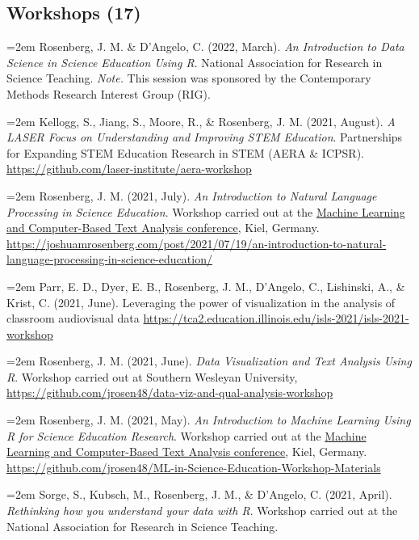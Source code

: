 \documentclass[
  14,
]{article}
\begin{document}
\hypertarget{workshops-17}{%
\subsection{Workshops (17)}\label{workshops-17}}

\hangindent=2em Rosenberg, J. M. \& D'Angelo, C. (2022, March). \emph{An
Introduction to Data Science in Science Education Using R}. National
Association for Research in Science Teaching. \emph{Note.} This session
was sponsored by the Contemporary Methods Research Interest Group (RIG).

\hangindent=2em Kellogg, S., Jiang, S., Moore, R., \& Rosenberg, J. M.
(2021, August). \emph{A LASER Focus on Understanding and Improving STEM
Education}. Partnerships for Expanding STEM Education Research in STEM
(AERA \& ICPSR). \url{https://github.com/laser-institute/aera-workshop}

\hangindent=2em Rosenberg, J. M. (2021, July). \emph{An Introduction to
Natural Language Processing in Science Education}. Workshop carried out
at the
\href{https://www.ipn.uni-kiel.de/en/the-ipn/news/gdcp-focus-conference-machine-learning-and-computer-based-text-analysis-may-6th-7th-2021-register-now}{Machine
Learning and Computer-Based Text Analysis conference}, Kiel, Germany.
\url{https://joshuamrosenberg.com/post/2021/07/19/an-introduction-to-natural-language-processing-in-science-education/}

\hangindent=2em Parr, E. D., Dyer, E. B., Rosenberg, J. M., D'Angelo,
C., Lishinski, A., \& Krist, C. (2021, June). Leveraging the power of
visualization in the analysis of classroom audiovisual data
\url{https://tca2.education.illinois.edu/isls-2021/isls-2021-workshop}

\hangindent=2em Rosenberg, J. M. (2021, June). \emph{Data Visualization
and Text Analysis Using R}. Workshop carried out at Southern Wesleyan
University,
\url{https://github.com/jrosen48/data-viz-and-qual-analysis-workshop}

\hangindent=2em Rosenberg, J. M. (2021, May). \emph{An Introduction to
Machine Learning Using R for Science Education Research}. Workshop
carried out at the
\href{https://www.ipn.uni-kiel.de/en/the-ipn/news/gdcp-focus-conference-machine-learning-and-computer-based-text-analysis-may-6th-7th-2021-register-now}{Machine
Learning and Computer-Based Text Analysis conference}, Kiel, Germany.
\url{https://github.com/jrosen48/ML-in-Science-Education-Workshop-Materials}

\hangindent=2em Sorge, S., Kubsch, M., Rosenberg, J. M., \& D'Angelo, C.
(2021, April). \emph{Rethinking how you understand your data with R}.
Workshop carried out at the National Association for Research in Science
Teaching.
\end{document}
